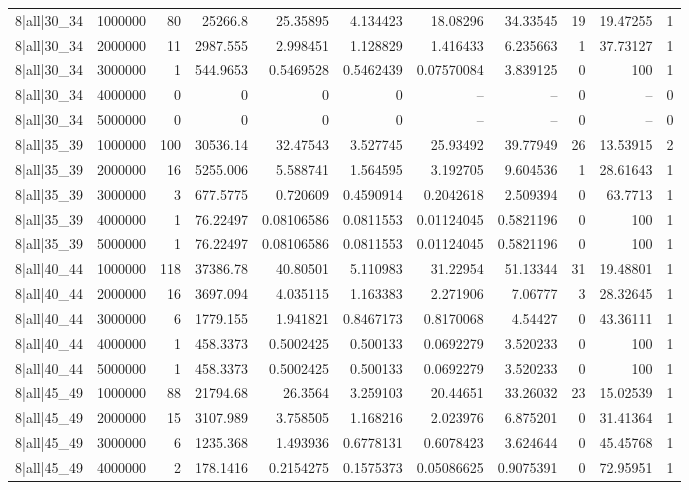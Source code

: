 \begin{tabular}{lrrrrrrrrrr}
8|all|30\_34 & 1000000 & 80 & 25266.8 & 25.35895 & 4.134423 & 18.08296 & 34.33545 & 19 & 19.47255 & 1 \\
8|all|30\_34 & 2000000 & 11 & 2987.555 & 2.998451 & 1.128829 & 1.416433 & 6.235663 & 1 & 37.73127 & 1 \\
8|all|30\_34 & 3000000 & 1 & 544.9653 & 0.5469528 & 0.5462439 & 0.07570084 & 3.839125 & 0 & 100 & 1 \\
8|all|30\_34 & 4000000 & 0 & 0 & 0 & 0 & -- & -- & 0 & -- & 0 \\
8|all|30\_34 & 5000000 & 0 & 0 & 0 & 0 & -- & -- & 0 & -- & 0 \\
8|all|35\_39 & 1000000 & 100 & 30536.14 & 32.47543 & 3.527745 & 25.93492 & 39.77949 & 26 & 13.53915 & 2 \\
8|all|35\_39 & 2000000 & 16 & 5255.006 & 5.588741 & 1.564595 & 3.192705 & 9.604536 & 1 & 28.61643 & 1 \\
8|all|35\_39 & 3000000 & 3 & 677.5775 & 0.720609 & 0.4590914 & 0.2042618 & 2.509394 & 0 & 63.7713 & 1 \\
8|all|35\_39 & 4000000 & 1 & 76.22497 & 0.08106586 & 0.0811553 & 0.01124045 & 0.5821196 & 0 & 100 & 1 \\
8|all|35\_39 & 5000000 & 1 & 76.22497 & 0.08106586 & 0.0811553 & 0.01124045 & 0.5821196 & 0 & 100 & 1 \\
8|all|40\_44 & 1000000 & 118 & 37386.78 & 40.80501 & 5.110983 & 31.22954 & 51.13344 & 31 & 19.48801 & 1 \\
8|all|40\_44 & 2000000 & 16 & 3697.094 & 4.035115 & 1.163383 & 2.271906 & 7.06777 & 3 & 28.32645 & 1 \\
8|all|40\_44 & 3000000 & 6 & 1779.155 & 1.941821 & 0.8467173 & 0.8170068 & 4.54427 & 0 & 43.36111 & 1 \\
8|all|40\_44 & 4000000 & 1 & 458.3373 & 0.5002425 & 0.500133 & 0.0692279 & 3.520233 & 0 & 100 & 1 \\
8|all|40\_44 & 5000000 & 1 & 458.3373 & 0.5002425 & 0.500133 & 0.0692279 & 3.520233 & 0 & 100 & 1 \\
8|all|45\_49 & 1000000 & 88 & 21794.68 & 26.3564 & 3.259103 & 20.44651 & 33.26032 & 23 & 15.02539 & 1 \\
8|all|45\_49 & 2000000 & 15 & 3107.989 & 3.758505 & 1.168216 & 2.023976 & 6.875201 & 0 & 31.41364 & 1 \\
8|all|45\_49 & 3000000 & 6 & 1235.368 & 1.493936 & 0.6778131 & 0.6078423 & 3.624644 & 0 & 45.45768 & 1 \\
8|all|45\_49 & 4000000 & 2 & 178.1416 & 0.2154275 & 0.1575373 & 0.05086625 & 0.9075391 & 0 & 72.95951 & 1 \\

\end{tabular}
